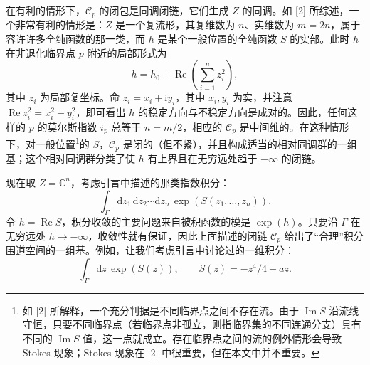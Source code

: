 \documentclass[11pt,a4paper,UTF8]{ctexart}
\theoremstyle{plain}
\theoremstyle{definition}
\begin{document}

在有利的情形下，$\mathcal C_p$ 的闭包是同调闭链，它们生成 $Z$ 的同调。如 [2] 所综述，一个非常有利的情形是：$Z$ 是一个复流形，其复维数为 $n$、实维数为 $m=2n$，属于容许许多全纯函数的那一类，而 $h$ 是某个一般位置的全纯函数 $S$ 的实部。此时 $h$ 在非退化临界点 $p$ 附近的局部形式为
\[
    h=h_0+\operatorname{Re}\left(\sum_{i=1}^{n}z_i^2\right),
\]
其中 $z_i$ 为局部复坐标。命 $z_i=x_i+\mathrm{i}y_i$，其中 $x_i,y_i$ 为实，并注意 $\operatorname{Re}z_i^2=x_i^2-y_i^2$，即可看出 $h$ 的稳定方向与不稳定方向是成对的。因此，任何这样的 $p$ 的莫尔斯指数 $i_p$ 总等于 $n=m/2$，相应的 $\mathcal C_p$ 是中间维的。在这种情形下，对一般位置\footnote[7]{如 [2] 所解释，一个充分判据是不同临界点之间不存在流。由于 $\operatorname{Im}S$ 沿流线守恒，只要不同临界点（若临界点非孤立，则指临界集的不同连通分支）具有不同的 $\operatorname{Im}S$ 值，这一点就成立。存在临界点之间的流的例外情形会导致 Stokes 现象；Stokes 现象在 [2] 中很重要，但在本文中并不重要。}的 $S$，$\mathcal C_p$ 是闭的（但不紧），并且构成适当的相对同调群的一组基；这个相对同调群分类了使 $h$ 有上界且在无穷远处趋于 $-\infty$ 的闭链。


现在取 $Z=\mathbb C^n$，考虑引言中描述的那类指数积分：
\begin{equation}
    \int_\Gamma \mathrm{d}z_1\,\mathrm{d}z_2\cdots\mathrm{d}z_n\,
    \exp\left(S(z_1,\dots,z_n)\right).
    \tag{2.31}
\end{equation}
令 $h=\operatorname{Re}S$，积分收敛的主要问题来自被积函数的模是 $\exp(h)$。只要沿 $\Gamma$ 在无穷远处 $h\to-\infty$，收敛性就有保证，因此上面描述的闭链 $\mathcal C_p$ 给出了“合理”积分围道空间的一组基。例如，让我们考虑引言中讨论过的一维积分：
\begin{equation}
    \int_\Gamma \mathrm{d}z\,\exp(S(z)),
    \qquad S(z)=-z^4/4+az.
    \tag{2.32}
\end{equation}
\end{document}
